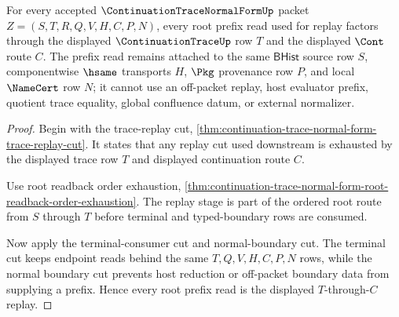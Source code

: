 \begin{theorem}
\label{thm:continuation-trace-normal-form-root-replay-prefix-totality}
For every accepted $\ContinuationTraceNormalFormUp$ packet
$Z=(S,T,R,Q,V,H,C,P,N)$, every root prefix read used for replay factors
through the displayed $\ContinuationTraceUp$ row $T$ and the displayed
$\Cont$ route $C$. The prefix read remains attached to the same
$\mathsf{BHist}$ source row $S$, componentwise $\hsame$ transports $H$,
$\Pkg$ provenance row $P$, and local $\NameCert$ row $N$; it cannot use an
off-packet replay, host evaluator prefix, quotient trace equality, global
confluence datum, or external normalizer.
\end{theorem}
\begin{proof}
Begin with the trace-replay cut,
\autoref{thm:continuation-trace-normal-form-trace-replay-cut}. It states that
any replay cut used downstream is exhausted by the displayed trace row $T$
and displayed continuation route $C$.

Use root readback order exhaustion,
\autoref{thm:continuation-trace-normal-form-root-readback-order-exhaustion}.
The replay stage is part of the ordered root route from $S$ through $T$
before terminal and typed-boundary rows are consumed.

Now apply the terminal-consumer cut and normal-boundary cut. The terminal cut
keeps endpoint reads behind the same $T,Q,V,H,C,P,N$ rows, while the normal
boundary cut prevents host reduction or off-packet boundary data from
supplying a prefix. Hence every root prefix read is the displayed
$T$-through-$C$ replay.
\end{proof}

